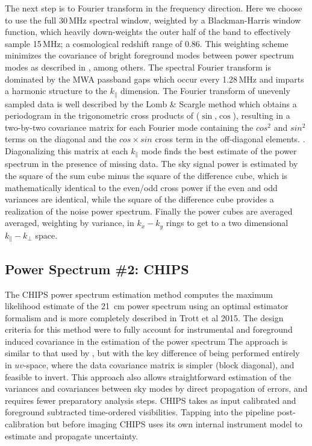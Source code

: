 \documentclass[preprint]{aastex}
\def\chipscite{Trott et al 2015}
\begin{document}
The next step is to Fourier transform in the frequency direction. Here we choose to use the full 30\,MHz spectral window, weighted by a Blackman-Harris window function, which heavily down-weights the outer half of the band to effectively sample 15\,MHz; a cosmological redshift range of 0.86. This weighting scheme minimizes the covariance of bright foreground modes between power spectrum modes as described in \cite{Thyagarajan:2013p10039,Parsons:2012p8896,Vedantham:2012p9026}, among others.  The spectral Fourier transform is dominated by the MWA passband gaps which occur every 1.28\,MHz and imparts a harmonic structure to the $k_\parallel$ dimension.  The Fourier transform of unevenly sampled data is well described by the Lomb \& Scargle method which obtains a periodogram in the trigonometric cross products of ($\sin$,$\cos$), resulting in a two-by-two covariance matrix for each Fourier mode containing the $cos^2$ and $sin^2$ terms on the diagonal and the $cos\times sin$ cross term in the off-diagonal elements. \cite{lomb1976,scargle1982}. Diagonalizing this matrix at each $k_\parallel$ mode finds the best estimate of the power spectrum in the presence of missing data.  The sky signal power is  estimated by the square of the sum cube minus the square of the difference cube, which  is mathematically identical to the even/odd cross power if the even and odd variances are identical, while the square of the difference cube provides a realization of the noise power spectrum. Finally the power cubes are averaged averaged, weighting by variance, in $k_x-k_y$ rings to get to a two dimensional $k_{\|}-k_{\bot}$ space.





\subsection{Power Spectrum \#2: CHIPS}
\label{sec:CHIPS}
The CHIPS power spectrum estimation method computes the maximum likelihood estimate of the 21~cm power spectrum using an optimal estimator formalism and is more completely described in \chipscite.  The design criteria for this method were to fully account for instrumental and foreground induced covariance in the estimation of the power spectrum  The approach is similar to that used by \cite{Liu:2011p8763}, but with the key difference of being performed entirely in $uv$-space, where the data covariance matrix is simpler (block diagonal), and feasible to invert. This approach also allows straightforward estimation of the variances and covariances between sky modes by direct propagation of errors, and requires fewer preparatory analysis steps. CHIPS takes as input calibrated and foreground subtracted time-ordered visibilities. Tapping into the pipeline post-calibration but before imaging CHIPS uses its own internal instrument model to estimate and propagate uncertainty.	
\end{document}

